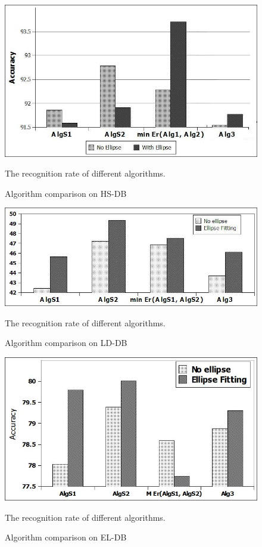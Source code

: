 \documentclass{article}
\begin{document}
 \begin{figure}
	\centering		
	 \includegraphics[scale=0.4]{images/testAlg.jpg}
	 	\caption{Algorithm comparison on HS-DB} The recognition rate of different algorithms. 
	 	\label{fig:test1}
\end{figure} 




\begin{figure}
	\centering		
	 \includegraphics[scale=0.4]{images/LDAlg.jpg}
	 	\caption{Algorithm comparison on LD-DB} The recognition rate of different algorithms. 
	 	\label{fig:testLD}
\end{figure} 

\begin{figure}
	\centering		
	 \includegraphics[scale=0.4]{images/AlgEL.jpg}
	 	\caption{Algorithm comparison on EL-DB} The recognition rate of different algorithms. 
	 	\label{fig:testEL}
\end{figure} 
\end{document}
